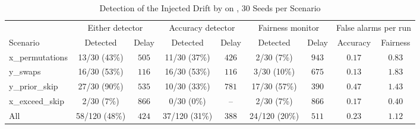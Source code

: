 \begin{table}[t]
\centering
\caption{Detection of the Injected Drift by \fado{} on \adult{}, 30 Seeds per Scenario}
\label{tab:detection}
\setlength{\tabcolsep}{5pt}
\footnotesize
\begin{tabular}{@{}l cc cc cc cc@{}}
\toprule
& \multicolumn{2}{c}{Either detector} & \multicolumn{2}{c}{Accuracy detector} & \multicolumn{2}{c}{Fairness monitor} & \multicolumn{2}{c}{False alarms per run} \\
\cmidrule(lr){2-3} \cmidrule(lr){4-5} \cmidrule(lr){6-7} \cmidrule(l){8-9}
Scenario & Detected & Delay & Detected & Delay & Detected & Delay & Accuracy & Fairness \\
\midrule
x\_permutations & 13/30 (43\%) & $505$ & 11/30 (37\%) & $426$ & 2/30 (7\%) & $943$ & $0.17$ & $0.83$ \\
y\_swaps & 16/30 (53\%) & $116$ & 16/30 (53\%) & $116$ & 3/30 (10\%) & $675$ & $0.13$ & $1.83$ \\
y\_prior\_skip & 27/30 (90\%) & $535$ & 10/30 (33\%) & $781$ & 17/30 (57\%) & $390$ & $0.47$ & $1.43$ \\
x\_exceed\_skip & 2/30 (7\%) & $866$ & 0/30 (0\%) & -- & 2/30 (7\%) & $866$ & $0.17$ & $0.40$ \\
\midrule
All & 58/120 (48\%) & $424$ & 37/120 (31\%) & $388$ & 24/120 (20\%) & $511$ & $0.23$ & $1.12$ \\
\bottomrule
\end{tabular}
\end{table}
